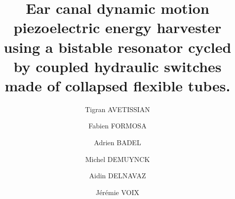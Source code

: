 \documentclass[3p,twocolumn,preprint]{elsarticle}
\begin{document}
\tableofcontents

\begin{frontmatter}



\title{Ear canal dynamic motion piezoelectric energy harvester using a bistable resonator cycled by coupled hydraulic switches made of collapsed flexible tubes.}



\address[symme]{Laboratoire SYMME - Université Savoie Mont Blanc, 7 Chemin de Bellevue, 74940, Annecy}
\address[critias]{Université du Québec - École de technologie supérieure, 1100 Rue Notre-Dame Ouest, Montréal, QC, H3C 1K3}


\author[symme]{Tigran AVETISSIAN}
\author[symme]{Fabien FORMOSA}
\author[symme]{Adrien BADEL}

\author[critias]{Michel DEMUYNCK}
\author[critias]{Aidin DELNAVAZ}
\author[critias]{Jérémie VOIX}


\begin{abstract}
\end{abstract}

\begin{keyword}
\end{keyword}

\end{frontmatter}

\end{document}
